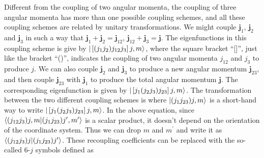 Different from the coupling of two angular momenta, the coupling of three angular momenta has more than one possible
 coupling schemes, and all these coupling schemes are related by unitary transformations. We might couple $\mathbf{j}_{1}$, $\mathbf{j}_{2}$ and $\mathbf{j}_{3}$ in such a way that
  $\mathbf{j}_{1} + \mathbf{j}_{2}=\mathbf{j}_{12}$, $\mathbf{j}_{12} + \mathbf{j}_{3}= \mathbf{j}$. The eigenfunctions in this coupling scheme is give by $| \left[(j_1 j_2) j_{12} j_3\right] j, m \rangle$, where
  the square bracket ``[]'', just like the bracket ``()'',  indicates the coupling of two angular momenta $j_{12}$ and $j_3$ 
  to produce  $j$. We can also couple $\mathbf{j}_{2}$ and $\mathbf{j}_{3}$ to produce a new angular momentum 
  $\mathbf{j}_{23}$, and then couple $\mathbf{j}_{23}$ with  $\mathbf{j}_{1}$ to produce the total angular
   momentum  $\mathbf{j}$. The corresponding eigenfunction is given by $| \left[j_1(j_2 j_3) j_{23}\right] j, m \rangle$. 
The transformation between the two different coupling schemes is
where $|  (j_1 j_{23}) j, m  \rangle$ is a short-hand way to write  $| \left[j_1(j_2 j_3) j_{23}\right] j, m \rangle$.  In the above 
equation, since $\langle  (j_{12} j_3) j, m \allowbreak |  (j_1 j_{23}) j^{\prime}, m^{\prime}  \rangle$ is a scalar product, it 
doesn't depend on the orientation of the coordinate system. Thus we can drop $m$ and $m^{\prime}$ and write it as 
$\langle  (j_{12} j_3) j  |  (j_1 j_{23}) j^{\prime}  \rangle$. These recoupling coefficients can be replaced with the so-called
6-$j$ symbols defined as


  
  
